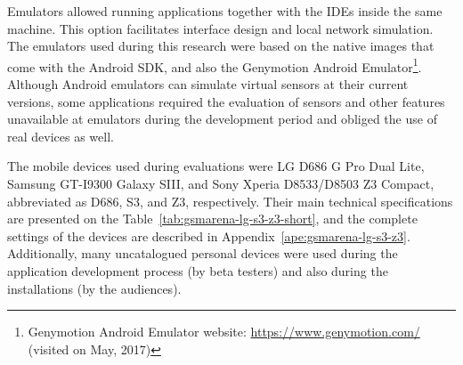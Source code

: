 Emulators allowed running applications together with the IDEs inside the same machine.
This option facilitates interface design and local network simulation.
The emulators used during this research were based on the native images that come with the Android SDK, and also the Genymotion Android Emulator\footnote{Genymotion Android Emulator website: \url{https://www.genymotion.com/} (visited on May, 2017)}.
Although Android emulators can simulate virtual sensors at their current versions, some applications required the evaluation of sensors and other features unavailable at emulators during the development period and obliged the use of real devices as well.

The mobile devices used during evaluations were LG D686 G Pro Dual Lite, Samsung GT-I9300 Galaxy SIII, and Sony Xperia D8533/D8503 Z3 Compact, abbreviated as D686, S3, and Z3, respectively.
Their main technical specifications are presented on the Table~\ref{tab:gsmarena-lg-s3-z3-short}, and the complete settings of the devices are described in Appendix~\ref{ape:gsmarena-lg-s3-z3}.
Additionally, many uncatalogued personal devices were used during the application development process (by beta testers) and also during the installations (by the audiences).

